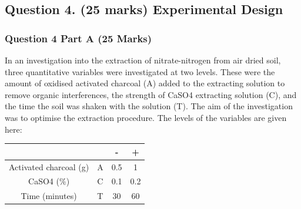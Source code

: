 \documentclass[a4paper,12pt]{article}
\begin{document}
\newpage


\subsection*{Question 4. (25 marks) Experimental Design }


\subsubsection*{Question 4 Part A (25 Marks)}

In an investigation into the extraction of nitrate-nitrogen from air dried soil, three quantitative variables were investigated at two levels. These were the amount of oxidised activated charcoal (A) added to the extracting solution to remove organic interferences, the strength of CaSO4 extracting solution (C), and the time the soil was shaken with the solution (T). The aim of the investigation was to optimise the extraction procedure. The levels of the variables are given here:
\begin{center}
	{
		\large
		\begin{tabular}{|cc|c|c|}
			\hline	&		&\phantom{sp}	{\LARGE -}\phantom{sp}	&	\phantom{sp} {\LARGE +} \phantom{sp}	\\ \hline
			Activated charcoal (g) 	&	A 	&	0.5	&	1	\\ \hline
			CaSO{4} (\%) 	&	C 	&	0.1	&	0.2	\\ \hline
			Time (minutes) 	&	T 	&	30	&	60	\\ \hline
		\end{tabular} 
	}
\end{center}
\end{document}
